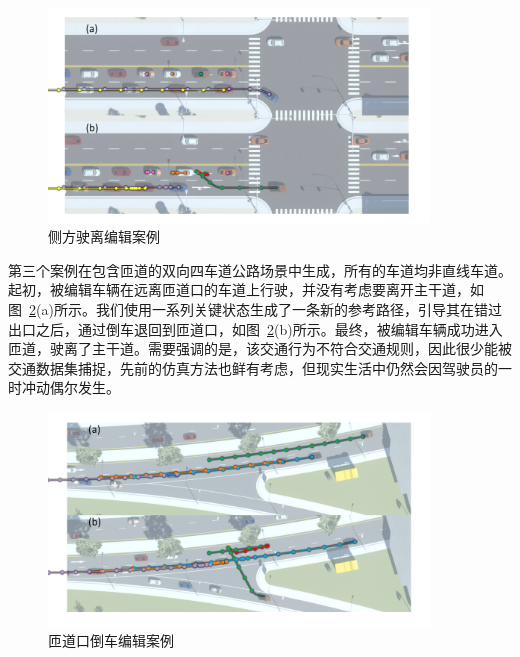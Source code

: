 \begin{figure}[!tbh]
\centering
\includegraphics[width=0.9\textwidth]{figure/reversing/escape v3.pdf}
\caption[侧方驶离编辑案例]{
侧方驶离编辑案例
}
\label{fig:reversing_escape}
\end{figure}


第三个案例在包含匝道的双向四车道公路场景中生成，所有的车道均非直线车道。起初，被编辑车辆在远离匝道口的车道上行驶，并没有考虑要离开主干道，如图~\ref{fig:reversing_ramp}(a)所示。我们使用一系列关键状态生成了一条新的参考路径，引导其在错过出口之后，通过倒车退回到匝道口，如图~\ref{fig:reversing_ramp}(b)所示。最终，被编辑车辆成功进入匝道，驶离了主干道。需要强调的是，该交通行为不符合交通规则，因此很少能被交通数据集捕捉，先前的仿真方法也鲜有考虑，但现实生活中仍然会因驾驶员的一时冲动偶尔发生。

\begin{figure}[!tbh]
\centering
\includegraphics[width=0.9\textwidth]{figure/reversing/ramp v3.pdf}
\caption[匝道口倒车编辑案例]{
匝道口倒车编辑案例
}
\label{fig:reversing_ramp}
\end{figure}


